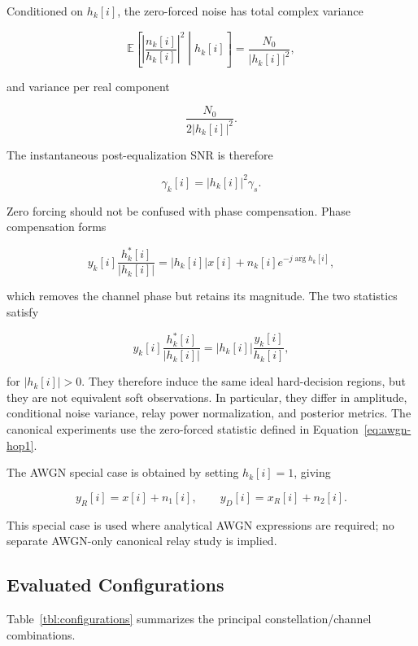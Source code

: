 Conditioned on $h_k[i]$, the zero-forced noise has total complex
variance

\[
\mathbb{E}
\left[
\left|
\frac{n_k[i]}{h_k[i]}
\right|^2
\middle|
h_k[i]
\right]
=
\frac{N_0}{|h_k[i]|^2},
\]

and variance per real component

\[
\frac{N_0}{2|h_k[i]|^2}.
\]

The instantaneous post-equalization SNR is therefore

\[
\gamma_k[i]
=
|h_k[i]|^2\gamma_s.
\]

Zero forcing should not be confused with phase compensation. Phase
compensation forms

\[
y_k[i]\frac{h_k^*[i]}{|h_k[i]|}
=
|h_k[i]|x[i]
+
n_k[i]e^{-j\arg h_k[i]},
\]

which removes the channel phase but retains its magnitude. The two
statistics satisfy

\[
y_k[i]\frac{h_k^*[i]}{|h_k[i]|}
=
|h_k[i]|
\frac{y_k[i]}{h_k[i]},
\]

for $|h_k[i]|>0$. They therefore induce the same ideal hard-decision
regions, but they are not equivalent soft observations. In particular,
they differ in amplitude, conditional noise variance, relay power
normalization, and posterior metrics. The canonical experiments use
the zero-forced statistic defined in
Equation~\eqref{eq:awgn-hop1}.

The AWGN special case is obtained by setting $h_k[i]=1$, giving

\[
y_R[i]=x[i]+n_1[i],
\qquad
y_D[i]=x_R[i]+n_2[i].
\]

This special case is used where analytical AWGN expressions are
required; no separate AWGN-only canonical relay study is implied.


\subsection{Evaluated Configurations}
\label{sec:evaluated-configurations}

Table~\ref{tbl:configurations} summarizes the principal
constellation/channel combinations.

